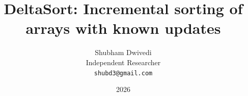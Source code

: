 \documentclass[11pt]{article}
\title{DeltaSort: Incremental sorting of arrays with known updates}
\author{Shubham Dwivedi \\
\small Independent Researcher \\
\small \texttt{shubd3@gmail.com}
}
\date{2026}
\theoremstyle{definition}
\theoremstyle{remark}
\begin{document}
\maketitle
\begin{abstract}

\end{abstract}





 




\clearpage


\clearpage

\end{document}

